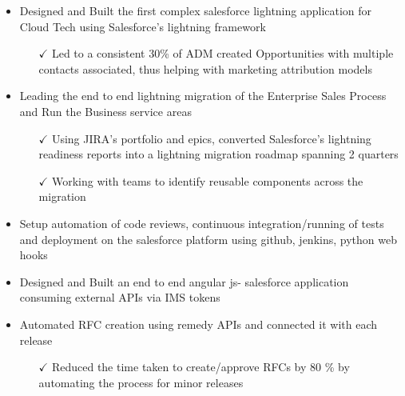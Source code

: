  \begin{itemize} \itemsep -2pt %
 \item 
 Designed and Built the first complex salesforce lightning application for Cloud Tech using Salesforce's lightning framework
 \itemsep -2pt
   \begin{itemize}
     \item[$\checkmark$]  \itemsep -8pt%
  Led to a consistent 30\% of ADM created Opportunities with multiple contacts associated, thus helping with marketing attribution models
\\
        \end{itemize}       
\end{itemize}

 \begin{itemize} \itemsep -2pt %
 \item 
Leading the end to end lightning migration of the Enterprise Sales Process and Run the Business service areas \itemsep -2pt
   \begin{itemize}
     \item[$\checkmark$]  \itemsep -8pt%
    Using JIRA's portfolio and epics,  converted Salesforce's lightning readiness reports into a lightning migration roadmap spanning 2 quarters \\
     \item[$\checkmark$]  \itemsep -8pt%
    Working with teams to identify reusable components across the migration \\
            \end{itemize}       
\end{itemize}
 
 \begin{itemize} \itemsep -2pt %
  \item Setup automation of code reviews, continuous integration/running of tests and deployment on the salesforce platform using github, jenkins, python web hooks\itemsep -2pt
      \end{itemize}

\begin{itemize} \itemsep -2pt %
 \item  Designed and Built an end to end angular js- salesforce application consuming external APIs via IMS tokens \itemsep -2pt
\end{itemize}

\begin{itemize} \itemsep -2pt %
 \item Automated RFC creation using remedy APIs and connected it with each release \itemsep -2pt
   \begin{itemize}
       \item[$\checkmark$]  \itemsep -8pt%
   Reduced the time taken to create/approve RFCs by 80 \% by automating the process for minor releases \\
       \end{itemize}       
\end{itemize}
  
